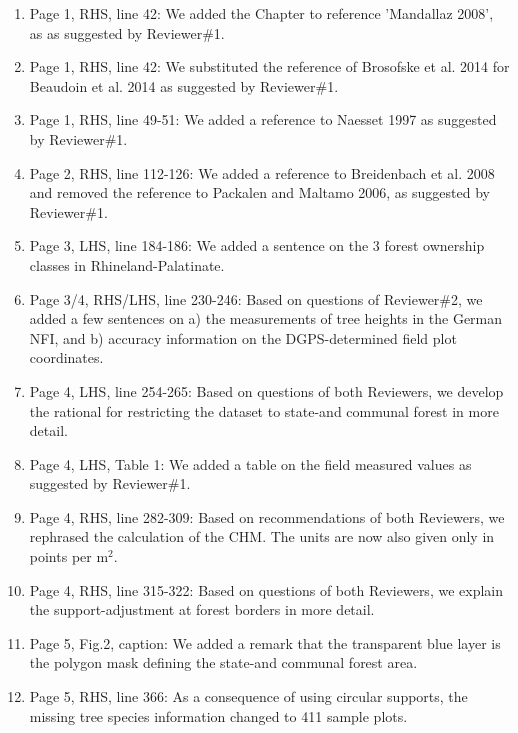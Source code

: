 \documentclass{article}
\begin{document}
\begin{enumerate}
	
	\item Page 1, RHS, line 42: We added the Chapter to reference 'Mandallaz 2008', as as suggested by Reviewer\#1.
	
	\item Page 1, RHS, line 42: We substituted the reference of Brosofske et al. 2014 for Beaudoin et al. 2014 as suggested by Reviewer\#1.
	
	\item Page 1, RHS, line 49-51: We added a reference to Naesset 1997 as suggested by Reviewer\#1.
	
	\item Page 2, RHS, line 112-126: We added a reference to Breidenbach et al. 2008 and removed the reference to Packalen and Maltamo 2006, as suggested by Reviewer\#1.
		
	\item Page 3, LHS, line 184-186: We added a sentence on the 3 forest ownership classes in Rhineland-Palatinate.
	
	\item Page 3/4, RHS/LHS, line 230-246: Based on questions of Reviewer\#2, we added a few sentences on a) the measurements of tree heights in the German NFI, and b) accuracy information on the DGPS-determined field plot coordinates.
	
	\item Page 4, LHS, line 254-265: Based on questions of both Reviewers, we develop the rational for restricting the dataset to state-and communal forest in more detail.
	
	\item Page 4, LHS, Table 1: We added a table on the field measured values as suggested by Reviewer\#1.
	
	\item Page 4, RHS, line 282-309: Based on recommendations of both Reviewers, we rephrased the calculation of the CHM. The units are now also given only in points per m$^2$. 
	
	\item Page 4, RHS, line 315-322: Based on questions of both Reviewers, we explain the support-adjustment at forest borders in more detail.
	
	\item Page 5, Fig.2, caption: We added a remark that the transparent blue layer is the polygon mask defining the state-and communal forest area.
	
	\item Page 5, RHS, line 366: As a consequence of using circular supports, the missing tree species information changed to 411 sample plots.
	

\end{enumerate}
\end{document}
